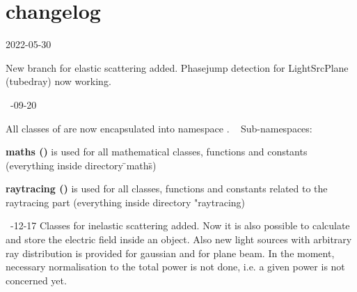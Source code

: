\chapter{changelog}
\hypertarget{md_changelog}{}\label{md_changelog}
2022-\/05-\/30 

New branch for elastic scattering added. Phasejump detection for Light\+Src\+Plane (tubedray) now working. 

~-\/09-\/20 

All classes of  are now encapsulated into namespace . ~\newline
 Sub-\/namespaces\+: ~\newline
 
\begin{DoxyItemize}
\item {\bfseries{maths ()}} is used for all mathematical classes, functions and constants (everything inside directory \"{}maths\"{})  
\item {\bfseries{raytracing ()}} is used for all classes, functions and constants related to the raytracing part (everything inside directory "{}raytracing)  
\end{DoxyItemize}

~-\/12-\/17 Classes for inelastic scattering added. Now it is also possible to calculate and store the electric field inside an object. Also new light sources with arbitrary ray distribution is provided for gaussian and for plane beam. In the moment, necessary normalisation to the total power is not done, i.\+e. a given power is not concerned yet. 
